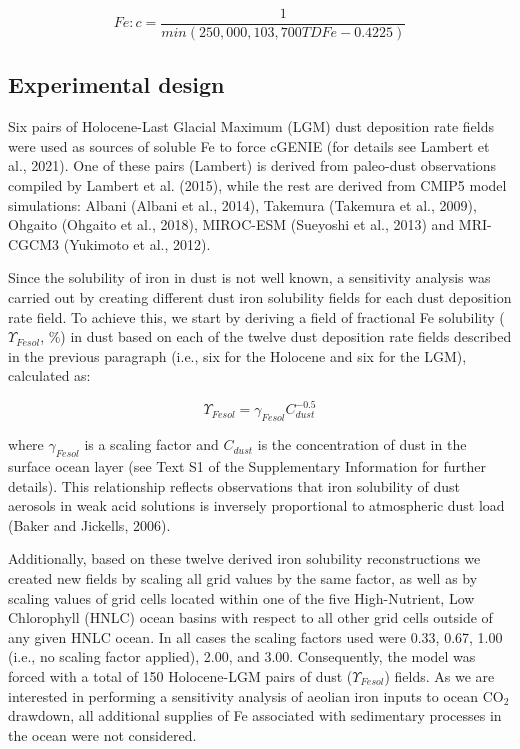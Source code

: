 \begin{linenomath*}
    \begin{equation}
Fe:c=\frac{1}{min(250,000,103,700 TDFe-0.4225)}
    \end{equation}
\end{linenomath*}

\subsection{Experimental design}

Six pairs of Holocene-Last Glacial Maximum (LGM) dust deposition rate fields were used as sources of soluble Fe to force cGENIE (for details see Lambert et al., 2021). One of these pairs (Lambert) is derived from paleo-dust observations compiled by Lambert et al. (2015), while the rest are derived from CMIP5 model simulations: Albani (Albani et al., 2014), Takemura (Takemura et al., 2009), Ohgaito (Ohgaito et al., 2018), MIROC-ESM (Sueyoshi et al., 2013) and MRI-CGCM3 (Yukimoto et al., 2012). 

Since the solubility of iron in dust is not well known, a sensitivity analysis was carried out by creating different dust iron solubility fields for each dust deposition rate field. To achieve this, we start by deriving a field of fractional Fe solubility ($\Upsilon_{Fesol}$, \%) in dust based on each of the twelve dust deposition rate fields described in the previous paragraph (i.e., six for the Holocene and six for the LGM), calculated as: 

\begin{linenomath*}
    \begin{equation}
\Upsilon_{Fesol}= \gamma_{Fesol}C_{dust}^{-0.5}
    \end{equation}
\end{linenomath*}

where $\gamma_{Fesol}$ is a scaling factor and $C_{dust}$ is the concentration of dust in the surface ocean layer (see Text S1 of the Supplementary Information for further details). This relationship reflects observations that iron solubility of dust aerosols in weak acid solutions is inversely proportional to atmospheric dust load (Baker and Jickells, 2006).

Additionally, based on these twelve derived iron solubility reconstructions we created new fields by scaling all grid values by the same factor, as well as by scaling values of grid cells located within one of the five High-Nutrient, Low Chlorophyll (HNLC) ocean basins with respect to all other grid cells outside of any given HNLC ocean. In all cases the scaling factors used were 0.33, 0.67, 1.00 (i.e., no scaling factor applied), 2.00, and 3.00. Consequently, the model was forced with a total of 150 Holocene-LGM pairs of dust ($\Upsilon_{Fesol}$) fields. As we are interested in performing a sensitivity analysis of aeolian iron inputs to ocean CO$_2$ drawdown, all additional supplies of Fe associated with sedimentary processes in the ocean were not considered.

